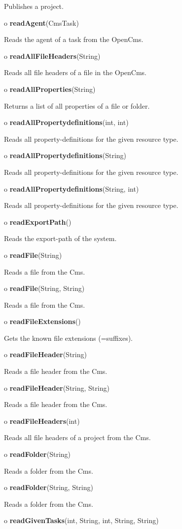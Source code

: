 \begin{description}
Publishes a project.  
\item o {\bf readAgent}(CmsTask)  

Reads the agent of a task from the OpenCms.  
\item o {\bf readAllFileHeaders}(String)  

Reads all file headers of a file in the OpenCms.  
\item o {\bf readAllProperties}(String)  

Returns a list of all properties of a file or folder.  
\item o {\bf readAllPropertydefinitions}(int, int)  

Reads all property-definitions for the given resource type.  
\item o {\bf readAllPropertydefinitions}(String)  

Reads all property-definitions for the given resource type.  
\item o {\bf readAllPropertydefinitions}(String, int)  

Reads all property-definitions for the given resource type.  
\item o {\bf readExportPath}()  

Reads the export-path of the system.  
\item o {\bf readFile}(String)  

Reads a file from the Cms.  
\item o {\bf readFile}(String, String)  

Reads a file from the Cms.  
\item o {\bf readFileExtensions}()  

Gets the known file extensions (=suffixes).  
\item o {\bf readFileHeader}(String)  

Reads a file header from the Cms.  
\item o {\bf readFileHeader}(String, String)  

Reads a file header from the Cms.  
\item o {\bf readFileHeaders}(int)  

Reads all file headers of a project from the Cms.  
\item o {\bf readFolder}(String)  

Reads a folder from the Cms.  
\item o {\bf readFolder}(String, String)  

Reads a folder from the Cms.  
\item o {\bf readGivenTasks}(int, String, int, String, String)  


\end{description}
